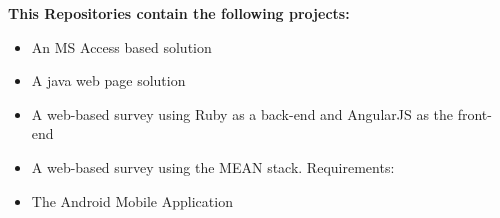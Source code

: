 \documentclass[12pt]{witseiepaper}
\begin{document}
\textbf{This Repositories contain the following projects:}
\begin{itemize}
\item An MS Access based solution
\item A java web page solution
\item A web-based survey using Ruby as a back-end and AngularJS as the front-end
\item A web-based survey using the MEAN stack. Requirements:
\item The Android Mobile Application
\end{itemize}


\clearpage %

 \thispagestyle{empty}\pagestyle{empty}
 
 \newpage
 
 
 


\end{document}
